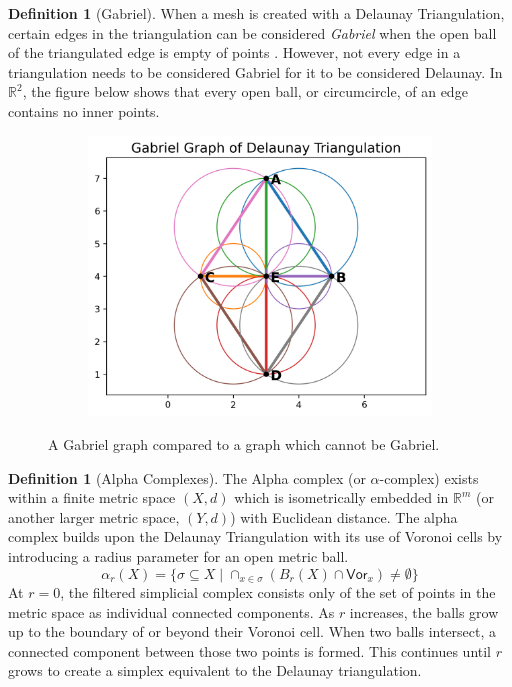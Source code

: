 \documentclass[ma]{uncgdissertationexp}
\theoremstyle{plain}
\theoremstyle{definition}
\newtheorem{definition}[theorem]{Definition}
\theoremstyle{remark}
\begin{document}
\begin{definition}[Gabriel]
When a mesh is created with a Delaunay Triangulation, certain edges in the triangulation can be considered \textit{Gabriel} when the open ball of the triangulated edge is empty of points \cite{gabriel}. However, not every edge in a triangulation needs to be considered Gabriel for it to be considered Delaunay. In $\mathbb{R}^{2}$, the figure below shows that every open ball, or circumcircle, of an edge contains no inner points.
\end{definition}
\begin{figure}[H]
    \centering
    \begin{subfigure}[b]{0.35\textwidth}
        \centering
        \includegraphics[width=\textwidth]{gabriel_circles.png}
    \end{subfigure}
    \caption{A Gabriel graph compared to a graph which cannot be Gabriel.}
    \label{fig:good_bad_gabriel}
\end{figure}

\begin{definition}[Alpha Complexes]
The Alpha complex (or $\alpha$-complex) exists within a finite metric space $(X, d)$ which is isometrically embedded in $\mathbb{R}^{m}$ (or another larger metric space, $(Y, d)$) with Euclidean distance. The alpha complex builds upon the Delaunay Triangulation with its use of Voronoi cells by introducing a radius parameter for an open metric ball. 
$$\alpha_{r}(X)=\{\sigma \subseteq X \mid \cap_{x\in \sigma} (B_{r}(X) \cap \mathsf{Vor}_{x}) \not= \emptyset\}$$
At $r=0$, the filtered simplicial complex consists only of the set of points in the metric space as individual connected components. As $r$ increases, the balls grow up to the boundary of or beyond their Voronoi cell. When two balls intersect, a connected component between those two points is formed. This continues until $r$ grows to create a simplex equivalent to the Delaunay triangulation.
\end{definition}
\end{document}
